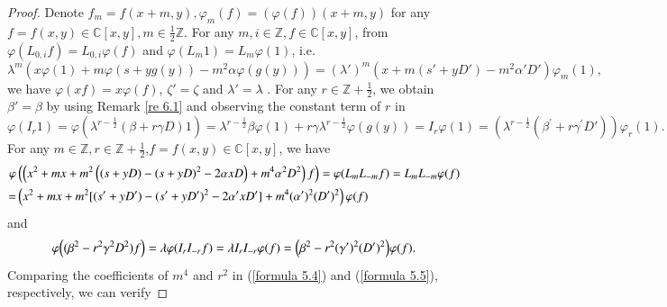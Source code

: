 \documentclass[12pt,reqno]{amsart}
\def\Z{\mathbb{Z}}
\def\C{\mathbb{C}}
\numberwithin{equation}{section}
\begin{document}
\begin{proof}
Denote 
$f_m=f(x+m,y),\varphi_m(f)=(\varphi(f))(x+m,y)$ for any $f=f(x,y)\in\C[x,y],m\in\frac{1}{2}\Z$. For any $m,i\in \Z,f\in\C[x,y]$, from
$\varphi(L_{0,i}f)=L_{0,i}\varphi(f)$ and $\varphi(L_m1)=L_m\varphi(1)$, i.e. $$\lambda^m\left(x\varphi(1)+m\varphi(s+yg(y)) - m^2\alpha\varphi(g(y)) \right) =(\lambda')^m \left(x+m(s'+yD')- m^2\alpha'D'\right) \varphi_m(1),$$
 we have $\varphi(xf)=x\varphi(f)$, $\zeta'=\zeta$ and $\lambda' =\lambda$ %
 . For any $r\in\Z+\frac{1}{2}$, we obtain $\beta'=\beta$ by using Remark \ref{re 6.1}  and observing the constant term of $r$ in $$\varphi(I_r1)=\varphi\left(\lambda^{r-\frac{1}{2}}(\beta+r\gamma D)1\right)
=\lambda^{r-\frac{1}{2}}\beta\varphi(1)+r\gamma \lambda^{r-\frac{1}{2}}\varphi(g(y))
=I_{r}\varphi(1)
=\left(\lambda^{r-\frac{1}{2}}(\beta^\prime+r\gamma^\prime D')\right)\varphi_r(1).$$
For any $m\in\Z,r\in\Z+\frac{1}{2}$,$f=f(x,y)\in\C[x,y]$, 
we have
\begin{equation}\label{formula 5.4}
\aligned
\varphi&\left(\left(x^2+mx+m^2\left((s+yD)-(s+yD)^2-2\alpha xD\right)+m^4\alpha^2D^2\right)f\right)=\varphi(L_mL_{-m}f)=L_mL_{-m}\varphi(f)\\
=&\left(x^2+mx+m^2[(s'+yD')-(s'+yD')^2-2\alpha' xD']+m^4(\alpha')^2(D')^2\right)\varphi(f)\ \ \\
\endaligned
\end{equation}
and
\begin{equation}\label{formula 5.5}
\aligned
\varphi\Big((\beta^2-r^2\gamma^2D^2)f\Big)=\lambda\varphi(I_rI_{-r}f)=\lambda I_rI_{-r}\varphi(f)
=\Big(\beta^2-r^2(\gamma')^2(D')^2\Big)\varphi(f).
\endaligned
\end{equation}
Comparing the coefficients of $m^4$ and $r^2$ in (\ref{formula 5.4}) and (\ref{formula 5.5}), respectively, we can verify

\end{proof}
\end{document}
